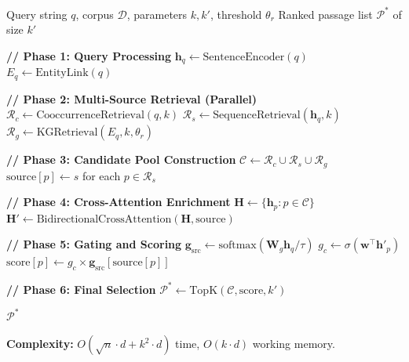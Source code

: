 \documentclass[11pt]{article}
\begin{document}
\begin{algorithm}[H]
\caption{TripleSourceRAG: Complete Retrieval Pipeline}
\label{alg:main}
\begin{algorithmic}[1]
\REQUIRE Query string $q$, corpus $\mathcal{D}$, parameters $k, k'$, threshold $\theta_r$
\ENSURE Ranked passage list $\mathcal{P}^*$ of size $k'$

\STATE \textbf{// Phase 1: Query Processing}
\STATE $\mathbf{h}_q \leftarrow \text{SentenceEncoder}(q)$ 
\STATE $E_q \leftarrow \text{EntityLink}(q)$ 

\STATE
\STATE \textbf{// Phase 2: Multi-Source Retrieval (Parallel)}
\STATE $\mathcal{R}_c \leftarrow \text{CooccurrenceRetrieval}(q, k)$ 
\STATE $\mathcal{R}_s \leftarrow \text{SequenceRetrieval}(\mathbf{h}_q, k)$ 
\STATE $\mathcal{R}_g \leftarrow \text{KGRetrieval}(E_q, k, \theta_r)$ 

\STATE
\STATE \textbf{// Phase 3: Candidate Pool Construction}
\STATE $\mathcal{C} \leftarrow \mathcal{R}_c \cup \mathcal{R}_s \cup \mathcal{R}_g$ 
\STATE $\text{source}[p] \leftarrow s$ for each $p \in \mathcal{R}_s$ 

\STATE
\STATE \textbf{// Phase 4: Cross-Attention Enrichment}
\STATE $\mathbf{H} \leftarrow \{\mathbf{h}_p : p \in \mathcal{C}\}$ 
\STATE $\mathbf{H}' \leftarrow \text{BidirectionalCrossAttention}(\mathbf{H}, \text{source})$ 

\STATE
\STATE \textbf{// Phase 5: Gating and Scoring}
\STATE $\mathbf{g}_{\text{src}} \leftarrow \text{softmax}(\mathbf{W}_g \mathbf{h}_q / \tau)$ 
    \STATE $g_c \leftarrow \sigma(\mathbf{w}^\top \mathbf{h}'_p)$ 
    \STATE $\text{score}[p] \leftarrow g_c \times \mathbf{g}_{\text{src}}[\text{source}[p]]$ 
\ENDFOR

\STATE
\STATE \textbf{// Phase 6: Final Selection}
\STATE $\mathcal{P}^* \leftarrow \text{TopK}(\mathcal{C}, \text{score}, k')$ 

\RETURN $\mathcal{P}^*$
\end{algorithmic}
\end{algorithm}

\textbf{Complexity:} $O(\sqrt{n} \cdot d + k^2 \cdot d)$ time, $O(k \cdot d)$ working memory.
\end{document}
